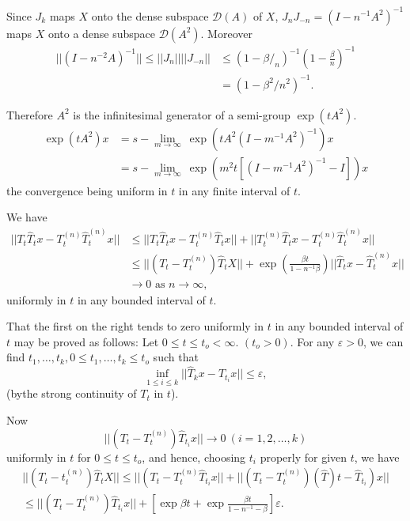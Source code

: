 Since $J_k$ maps $X$ onto the dense subspace $\mathscr{D}(A)$ of $X$,
$J_n J_{-n}= (I-n^{-1} A^2)^{-1}$ maps $X$ onto a dense subspace
$\mathscr{D}(A^2)$. Moreover 
\begin{align*} 
 || (I-n^{-2}A)^{-1} || \le || J_n || || J_{-n} || & \le (1-
 \beta/_n)^{-1} \left(1- \frac{\beta}{n}\right)^{-1}\\ 
 &= (1- \beta^2/ n^2)^{-1}.
\end{align*} 

Therefore $A^2$ is the infinitesimal generator of a semi-group $\exp (tA^2)$. 
\begin{align*}
 \exp (t A^2) x &= s-\lim_{m\to \infty}~ \exp (tA^2 (I- m^{-1} A^2)^{-1})x\\
 &= s-\lim_{m\to \infty} ~\exp (m^2 t [ (I -m^{-1} A^2 )^{-1} -I]) x
\end{align*}  
the convergence being uniform in $t$ in any finite interval of $t$.

We have 
\begin{align*}
 || T_t \hat{T}_t x- T^{(n)}_t \hat{T}^{(n)}_t x || &\le || T_t
 \hat{T}_t x- T^{(n)}_t \hat{T}_t x || + || T^{(n)}_t \hat{T}_t x-
 T_t^{(n)} \hat{T}_t^{(n)} x || \\ 
 &\le || \left(T_t - T^{(n)}_t \right) \hat{T}_t X || + \exp \left(
 \frac{\beta t}{1-n^{-1} \beta}\right) || \hat{T}_t x-
 \hat{T}_t^{(n)} x || \\ 
 & \to 0 \text{ as } n \to \infty,
\end{align*}
uniformly in $t$ in any bounded interval of $t$.

That the first on the right tends to zero uniformly in $t$ in any
bounded interval of $t$ may be proved as follows: Let $0 \le t \le t_o
< \infty$. $(t_o > 0)$. For any $\varepsilon > 0$, we can find $t_1,
\ldots, t_k, 0 \le t_1, \ldots, t_k \le t_o$ such that 
$$
\inf_{1 \le i \le k} || \hat{T}_k x- T_{t_i}x || \le \varepsilon, 
$$
(by\pageoriginale the strong continuity of $T_t$ in $t$).

Now
$$
|| (T_t- T_t^{(n)}) \hat{T}_{t_i} x || \to 0~ (i= 1,2, \ldots, k)
$$
uniformly in $t$ for $0 \le t \le t_o$, and hence, choosing $t_i $
properly for given $t$, we have 
\begin{align*}
 || (T_t - t^{(n)}_t ) \hat{T}_t X || \le || (T_t - T^{(n)}_t
 \hat{T}_{t_i} x || + || (T_t- T^{(n)}_t) (\hat{T})t -
 \hat{T}_{t_i}) x || \\ 
 \le || (T_t - T^{(n)}_t) \hat{T}_{t_i} x || + \left[\exp \beta t + \exp
  \frac{\beta t}{1-n^{-1}-\beta}\right] \varepsilon.  
\end{align*} 

